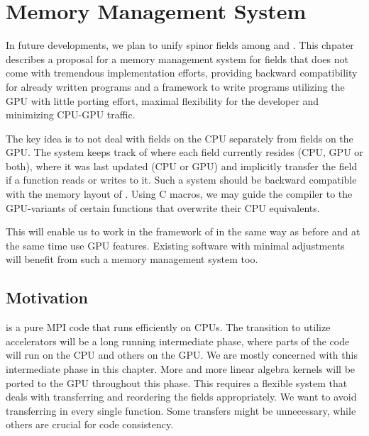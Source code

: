 \chapter{Memory Management System}
\label{ch:p1:memory}


In future developments, we plan to unify spinor fields among \openqxd and \quda.
This chpater describes a proposal for a memory management system for fields that does not come with tremendous implementation efforts, providing backward compatibility for already written programs and a framework to write programs utilizing the GPU with little porting effort, maximal flexibility for the developer and minimizing CPU-GPU traffic.

The key idea is to not deal with fields on the CPU separately from fields on the GPU.
The system  keeps track of where each field currently resides (CPU, GPU or both), where it was last updated (CPU or GPU) and implicitly transfer the field if a function reads or writes to it.
Such a system should be backward compatible with the memory layout of \openqxd.
Using C macros, we may guide the compiler to the GPU-variants of certain functions that overwrite their CPU equivalents.

This will enable us to work in the framework of \openqxd in the same way as before and at the same time use GPU features. 
Existing software with minimal adjustments will benefit from such a memory management system too.

\section{Motivation}

\Openqxd is a pure MPI code that runs efficiently on CPUs.
The transition to utilize accelerators will be a long running intermediate phase, where parts of the code will run on the CPU and others on the GPU.
We are mostly concerned with this intermediate phase in this chapter.
More and more linear algebra kernels will be ported to the GPU throughout this phase.
This requires a flexible system that deals with transferring and reordering the fields appropriately.
We want to avoid transferring in every single function.
Some transfers might be unnecessary, while others are crucial for code consistency.

